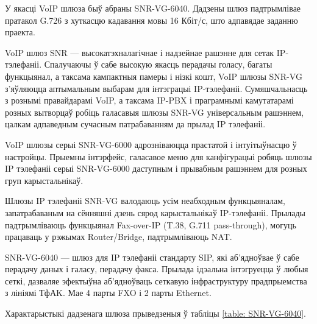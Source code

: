 У якасці VoIP шлюза быў абраны SNR-VG-6040. Дадзены шлюз падтрымлівае
пратакол G.726 з хуткасцю кадавання мовы 16 Кбіт/с, што адпавядае
заданню праекта.

VoIP шлюз SNR --- высокатэхналагічнае і надзейнае рашэнне для сетак IP-тэлефаніі. Спалучаючы ў сабе высокую якасць перадачы голасу, багаты функцыянал, а таксама кампактныя памеры і нізкі кошт, VoIP шлюзы SNR-VG з'яўляюцца аптымальным выбарам для інтэграцыі IP-тэлефаніі. Сумяшчальнасць з рознымі правайдарамі VoIP, а таксама IP-PBX і праграмнымі камутатарамі розных вытворцаў робіць галасавыя шлюзы SNR-VG універсальным рашэннем, цалкам адпаведным сучасным патрабаванням да прылад IP тэлефаніі.

VoIP шлюзы серыі SNR-VG-6000 адрозніваюцца прастатой і інтуітыўнасцю ў настройцы. Прыемны інтэрфейс, галасавое меню для канфігурацыі робяць шлюзы IP тэлефаніі серыі SNR-VG-6000 даступным і прывабным рашэннем для розных груп карыстальнікаў.

Шлюзы IP тэлефаніі SNR-VG валодаюць усім неабходным функцыяналам, запатрабаваным на сённяшні дзень сярод карыстальнікаў IP-тэлефаніі. Прылады падтрымліваюць функцыянал Fax-over-IP (T.38, G.711 pass-through), могуць працаваць у рэжымах Router/Bridge, падтрымліваюць NAT.

SNR-VG-6040 --- шлюз для IP тэлефаніі стандарту SIP, які аб'ядноўвае ў сабе перадачу даных і галасу, перадачу факса. Прылада ідэальна інтэгруецца ў любыя сеткі, дазваляе эфектыўна аб'ядноўваць сеткавую інфраструктуру прадпрыемства з лініямі ТфАK. Мае 4 парты FXO і 2 парты Ethernet.

Характарыстыкі дадзенага шлюза прыведзеныя ў табліцы
\ref{table: SNR-VG-6040}.
